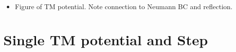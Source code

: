 \begin{itemize}
    Dan has:
    \begin{equation}
      \dlangle \exp\left[-\int_0^T dt V_{TM}(x-d)\right]\drangle = 1 + \frac{\sinh(\Xi/2)}{\cosh\Xi}[\sgn(d-c)e^{\sgn(d)\Xi/2} + \sgn(d)e^{-\sgn(d)\Xi/2}]e^{\left[c^2-(|d|+|c-d|)^2\right]/2t}.
    \end{equation}
    This agrees with my expressions for all cases.  This is useful for our numerical work.  
    Let us check out the $\Xi$ prefactor against my work.  
    \begin{align}
      F_{d>0,c<d} =&\frac{\sinh(\Xi/2)}{\cosh\Xi}[\sgn(d-c)e^{\sgn(d)\Xi/2} + \sgn(d)e^{-\sgn(d)\Xi/2}]\\
      =&\frac{\sinh(\Xi/2)}{\cosh\Xi}[e^{\Xi/2} + e^{-\Xi/2}] = \frac{e^{\Xi} - e^{-\Xi}}{e^\Xi+ e^\Xi}  
    \end{align}
    works.
    \begin{align}
      F_{d>0,d<c} =&\frac{\sinh(\Xi/2)}{\cosh\Xi}[-e^{\Xi/2} + e^{-\Xi/2}] = -\frac{ e^{-\Xi} + e^{\Xi} -2}{e^\Xi + e^{-\Xi}},
    \end{align}
    works, 
    \begin{align}
      F_{d<0,c<d} =\frac{\sinh(\Xi/2)}{\cosh\Xi}[e^{-\Xi/2} -e^{\Xi/2}]=\frac{[(e^{\Xi/2}- e^{-\Xi/2})(e^{-\Xi/2} -e^{\Xi/2})]}{e^\Xi + e^{-\Xi}}=-\frac{e^\Xi + e^{-\Xi} -2}{e^\Xi + e^{-\Xi}},
    \end{align}
    works, and 
    \begin{align}
      F_{d<0,d<c} =&\frac{\sinh(\Xi/2)}{\cosh\Xi}[-e^{\Xi/2} -e^{-\Xi/2}] = -\frac{e^\Xi - e^{-\Xi}}{e^\Xi + e^{-\Xi}}
    \end{align}
  \item Figure of TM potential.  Note connection to Neumann BC and reflection.  
\end{itemize}

\section{Single TM potential and Step}

